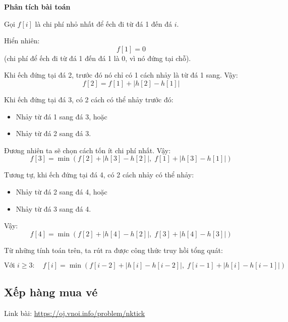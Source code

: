 \documentclass{article}
\begin{document}
\textbf{Phân tích bài toán}


Gọi \( f[i] \) là chi phí nhỏ nhất để ếch đi từ đá 1 đến đá \( i \).

Hiển nhiên:
\[
f[1] = 0
\]
(chi phí để ếch đi từ đá 1 đến đá 1 là 0, vì nó đứng tại chỗ).

\vspace{1em}

Khi ếch đứng tại đá 2, trước đó nó chỉ có 1 cách nhảy là từ đá 1 sang.  
Vậy:
\[
f[2] = f[1] + |h[2] - h[1]|
\]

\vspace{1em}

Khi ếch đứng tại đá 3, có 2 cách có thể nhảy trước đó:

\begin{itemize}
    \item Nhảy từ đá 1 sang đá 3, hoặc
    \item Nhảy từ đá 2 sang đá 3.
\end{itemize}

Đương nhiên ta sẽ chọn cách tốn ít chi phí nhất.  
Vậy:
\[
f[3] = \min \left( f[2] + |h[3] - h[2]|, \; f[1] + |h[3] - h[1]| \right)
\]

\vspace{1em}

Tương tự, khi ếch đứng tại đá 4, có 2 cách nhảy có thể nhảy:

\begin{itemize}
    \item Nhảy từ đá 2 sang đá 4, hoặc
    \item Nhảy từ đá 3 sang đá 4.
\end{itemize}

Vậy:
\[
f[4] = \min \left( f[2] + |h[4] - h[2]|, \; f[3] + |h[4] - h[3]| \right)
\]

\vspace{1em}

Từ những tính toán trên, ta rút ra được công thức truy hồi tổng quát:

\[
\text{Với } i \geq 3: \quad f[i] = \min \left( f[i - 2] + |h[i] - h[i-2]|, \; f[i - 1] + |h[i] - h[i-1]| \right)
\]


\subsection{Xếp hàng mua vé}
Link bài: \url{https://oj.vnoi.info/problem/nktick}
\end{document}
